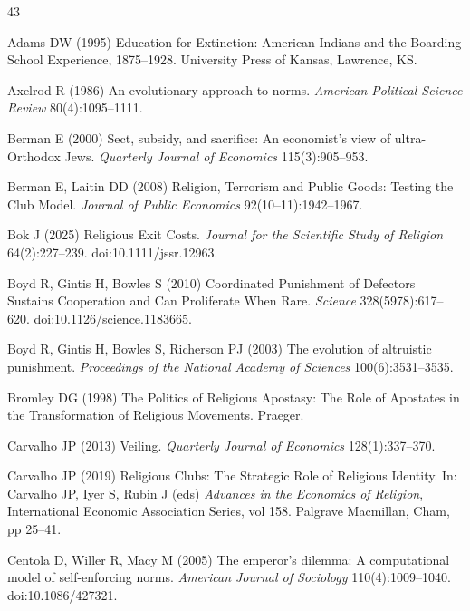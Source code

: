 \documentclass[12pt]{article}
\begin{document}
\begin{thebibliography}{43}

Adams DW (1995) Education for Extinction: American Indians and the Boarding School Experience, 1875--1928. University Press of Kansas, Lawrence, KS.

Axelrod R (1986) An evolutionary approach to norms. \textit{American Political Science Review} 80(4):1095--1111.

Berman E (2000) Sect, subsidy, and sacrifice: An economist's view of ultra-Orthodox Jews. \textit{Quarterly Journal of Economics} 115(3):905--953.

Berman E, Laitin DD (2008) Religion, Terrorism and Public Goods: Testing the Club Model. \textit{Journal of Public Economics} 92(10--11):1942--1967.

Bok J (2025) Religious Exit Costs. \textit{Journal for the Scientific Study of Religion} 64(2):227--239. doi:10.1111/jssr.12963.

Boyd R, Gintis H, Bowles S (2010) Coordinated Punishment of Defectors Sustains Cooperation and Can Proliferate When Rare. \textit{Science} 328(5978):617--620. doi:10.1126/science.1183665.

Boyd R, Gintis H, Bowles S, Richerson PJ (2003) The evolution of altruistic punishment. \textit{Proceedings of the National Academy of Sciences} 100(6):3531--3535.

Bromley DG (1998) The Politics of Religious Apostasy: The Role of Apostates in the Transformation of Religious Movements. Praeger.

Carvalho JP (2013) Veiling. \textit{Quarterly Journal of Economics} 128(1):337--370.

Carvalho JP (2019) Religious Clubs: The Strategic Role of Religious Identity. In: Carvalho JP, Iyer S, Rubin J (eds) \textit{Advances in the Economics of Religion}, International Economic Association Series, vol 158. Palgrave Macmillan, Cham, pp 25--41.

Centola D, Willer R, Macy M (2005) The emperor's dilemma: A computational model of self-enforcing norms. \textit{American Journal of Sociology} 110(4):1009--1040. doi:10.1086/427321.


\end{thebibliography}
\end{document}
